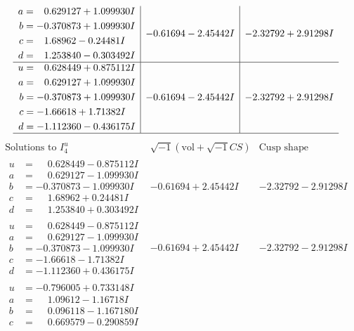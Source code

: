 \documentclass[1p]{elsarticle_modified}
\theoremstyle{definition}
\newcommand{\I}{\sqrt{-1}}
\begin{document}
$$\begin{array}{c|c|c}
\begin{aligned}
a &= \phantom{-}0.629127 + 1.099930 I \\
b &= -0.370873 + 1.099930 I \\
c &= \phantom{-}1.68962 - 0.24481 I \\
d &= \phantom{-}1.253840 - 0.303492 I\end{aligned}
 & -0.61694 - 2.45442 I & -2.32792 + 2.91298 I \\ \hline\begin{aligned}
u &= \phantom{-}0.628449 + 0.875112 I \\
a &= \phantom{-}0.629127 + 1.099930 I \\
b &= -0.370873 + 1.099930 I \\
c &= -1.66618 + 1.71382 I \\
d &= -1.112360 - 0.436175 I\end{aligned}
 & -0.61694 - 2.45442 I & -2.32792 + 2.91298 I\\
 \hline 
 \end{array}$$\newpage$$\begin{array}{c|c|c}  
\text{Solutions to }I^u_{4}& \I (\text{vol} + \sqrt{-1}CS) & \text{Cusp shape}\\
 \hline 
\begin{aligned}
u &= \phantom{-}0.628449 - 0.875112 I \\
a &= \phantom{-}0.629127 - 1.099930 I \\
b &= -0.370873 - 1.099930 I \\
c &= \phantom{-}1.68962 + 0.24481 I \\
d &= \phantom{-}1.253840 + 0.303492 I\end{aligned}
 & -0.61694 + 2.45442 I & -2.32792 - 2.91298 I \\ \hline\begin{aligned}
u &= \phantom{-}0.628449 - 0.875112 I \\
a &= \phantom{-}0.629127 - 1.099930 I \\
b &= -0.370873 - 1.099930 I \\
c &= -1.66618 - 1.71382 I \\
d &= -1.112360 + 0.436175 I\end{aligned}
 & -0.61694 + 2.45442 I & -2.32792 - 2.91298 I \\ \hline\begin{aligned}
u &= -0.796005 + 0.733148 I \\
a &= \phantom{-}1.09612 - 1.16718 I \\
b &= \phantom{-}0.096118 - 1.167180 I \\
c &= \phantom{-}0.669579 - 0.290859 I \\

\end{aligned}
\end{array}$$
\end{document}
